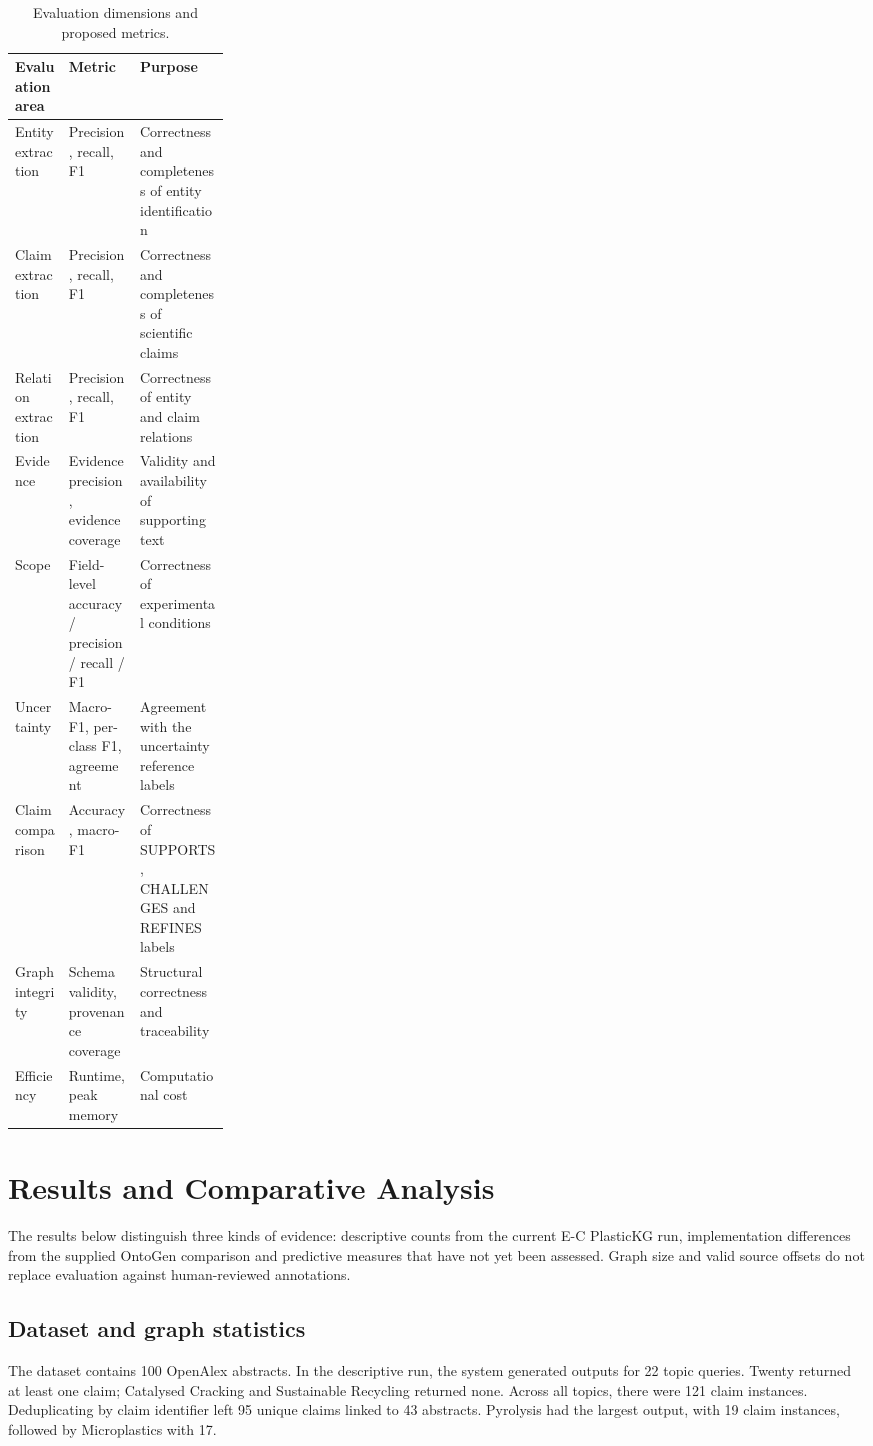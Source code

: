 \documentclass[11pt,a4paper]{article}
\begin{document}
\begin{table}[htbp]
\centering
\caption{Evaluation dimensions and proposed metrics.}
\label{tab:metrics}
\begin{tabularx}{\linewidth}{>{\raggedright\arraybackslash}p{0.25\linewidth}XX}
\toprule
\textbf{Evaluation area} & \textbf{Metric} & \textbf{Purpose}\\
\midrule
Entity extraction & Precision, recall, F1 & Correctness and completeness of entity identification\\
Claim extraction & Precision, recall, F1 & Correctness and completeness of scientific claims\\
Relation extraction & Precision, recall, F1 & Correctness of entity and claim relations\\
Evidence & Evidence precision, evidence coverage & Validity and availability of supporting text\\
Scope & Field-level accuracy / precision / recall / F1 & Correctness of experimental conditions\\
Uncertainty & Macro-F1, per-class F1, agreement & Agreement with the uncertainty reference labels\\
Claim comparison & Accuracy, macro-F1 & Correctness of SUPPORTS, CHALLENGES and REFINES labels\\
Graph integrity & Schema validity, provenance coverage & Structural correctness and traceability\\
Efficiency & Runtime, peak memory & Computational cost\\
\bottomrule
\end{tabularx}
\end{table}

\section{Results and Comparative Analysis}

The results below distinguish three kinds of evidence: descriptive counts from the current E-C PlasticKG run, implementation differences from the supplied OntoGen comparison and predictive measures that have not yet been assessed. Graph size and valid source offsets do not replace evaluation against human-reviewed annotations.

\subsection{Dataset and graph statistics}

The dataset contains 100 OpenAlex abstracts. In the descriptive run, the system generated outputs for 22 topic queries. Twenty returned at least one claim; Catalysed Cracking and Sustainable Recycling returned none. Across all topics, there were 121 claim instances. Deduplicating by claim identifier left 95 unique claims linked to 43 abstracts. Pyrolysis had the largest output, with 19 claim instances, followed by Microplastics with 17.
\end{document}
